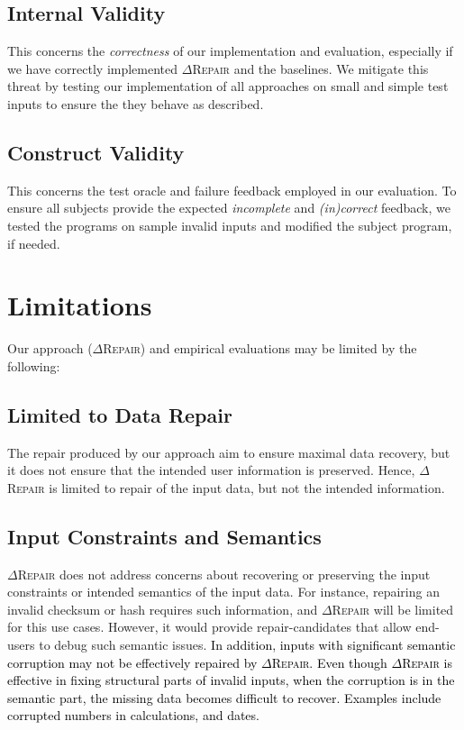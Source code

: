 \documentclass[acmsmall,screen,review,anonymous]{acmart}
\newcommand{\revise}[1]{\textcolor{black}{#1}}
\newcommand{\approach}{\textsc{$\Delta$Repair}\xspace}
\newcommand{\drepair}{\approach}
\begin{document}
\subsection{Internal Validity} This concerns the \textit{correctness} of our implementation and evaluation, especially if we have correctly implemented \approach and the baselines. We mitigate this threat by testing our implementation of all approaches on small and simple test inputs to ensure the they behave as described. 


\subsection{Construct Validity} This concerns the test oracle and failure feedback employed in our evaluation. To ensure all subjects provide the expected \textit{incomplete} and \textit{(in)correct} feedback, we tested the programs on sample invalid inputs and modified the subject program, if needed. 


\section{Limitations}
Our approach (\approach) and empirical evaluations may be limited by the following: %

\subsection{Limited to Data Repair} The repair produced by our approach aim to ensure maximal data recovery, but it does not ensure that the intended user information is preserved. Hence, \approach is limited to repair of the input data, but not the intended information. 


\subsection{Input Constraints and Semantics} \approach does not address concerns about recovering or preserving the input constraints or intended semantics of the input data. For instance, repairing an invalid checksum or hash requires such information, and \approach will be limited for this use cases. However, it would provide repair-candidates that allow end-users to debug such semantic issues. 
\revise{
In addition, inputs with significant semantic corruption may not be effectively repaired by \drepair. Even though \drepair is effective in fixing structural parts of invalid inputs, when the corruption is in the semantic part, the missing data becomes difficult to recover. Examples include corrupted numbers in calculations, and dates.}
\end{document}

